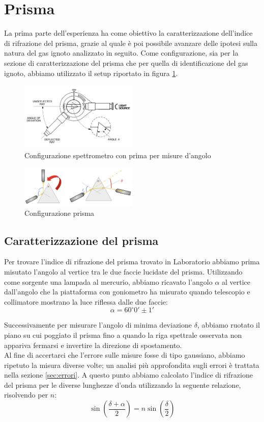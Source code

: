 \documentclass[letterpaper,12pt]{article}
\begin{document}
\section{Prisma}
La prima parte dell'esperienza ha come obiettivo la caratterizzazione dell'indice di rifrazione del prisma, 
grazie al quale è poi possibile avanzare delle ipotesi sulla natura del gas ignoto analizzato in seguito. Come configurazione, sia per
la sezione di caratterizzazione del prisma che per quella di identificazione del gas ignoto, abbiamo utilizzato il setup
riportato in figura \ref{fig:SetupPrisma}.
\begin{figure}[h!]
	\centering
	\includegraphics[width = 0.5\textwidth]{SetupIniziale.jpeg}
	\caption{Configurazione spettrometro con prima per misure d'angolo}
	\label{fig:SetupPrisma}
\end{figure}

\begin{figure}[h!]
	\centering
	\includegraphics[width = 0.5\textwidth]{Prisma.jpeg}
	\caption{Configurazione prisma}
	\label{fig:Prisma}
\end{figure}


\subsection{Caratterizzazione del prisma}
Per trovare l'indice di rifrazione del prisma trovato in Laboratorio
abbiamo prima misutato l'angolo al vertice tra le due faccie lucidate
del prisma. Utilizzando come sorgente una lampada al mercurio, abbiamo 
ricavato l'angolo $\alpha$ al vertice dall'angolo che la piattaforma con goniometro
ha misurato quando telescopio e collimatore mostrano la luce riflessa dalle due faccie:
$$\alpha = 60^{\circ} 0' \pm 1'$$


Successivamente per misurare l'angolo di minima deviazione $\delta$, abbiamo ruotato il piano su cui poggiato il prisma fino a quando
la riga spettrale osservata non appariva fermarsi e invertire la direzione di spostamento. \\
Al fine di accertarci che l'errore sulle misure fosse di tipo gaussiano, abbiamo ripetuto la misura diverse volte; un analisi più
approfondita sugli errori è trattata nella sezione \ref{sec:errori}.
A questo punto abbiamo calcolato l'indice di rifrazione del prisma per le diverse lunghezze d'onda utilizzando la seguente relazione, risolvendo per $n$:
\begin{equation}
    \sin(\frac{\delta + \alpha}{2}) = n \sin(\frac{\delta}{2})
    \label{eq:indice}
\end{equation}
\end{document}
